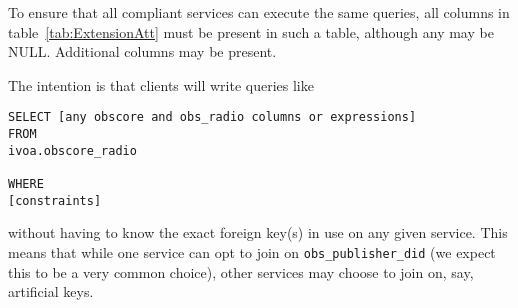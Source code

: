 \documentclass[11pt,a4paper]{ivoa}
\begin{document}
To ensure that all compliant services can execute the same queries,
all columns in table~\ref{tab:ExtensionAtt} must be present in such a
table, although any may be NULL. Additional columns may be present.

The intention is that clients will write queries like
\begin{lstlisting}
SELECT [any obscore and obs_radio columns or expressions]
FROM
ivoa.obscore_radio

WHERE
[constraints]
\end{lstlisting}
without having to know the exact foreign key(s) in use on any given
service.  This means that while one service can opt to join on
\verb|obs_publisher_did| (we expect this to be a very common choice),
other services may choose to join on, say, artificial keys.
\end{document}
